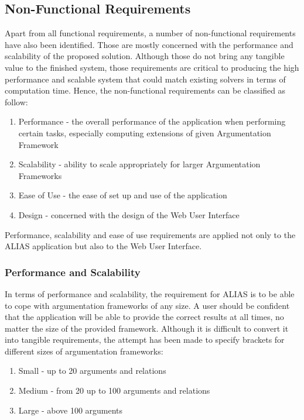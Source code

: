 \subsection{Non-Functional Requirements}
Apart from all functional requirements, a number of non-functional requirements have also been identified. Those are mostly concerned with the performance and scalability of the proposed solution. Although those do not bring any tangible value to the finished system, those requirements are critical to producing the high performance and scalable system that could match existing solvers in terms of computation time. Hence, the non-functional requirements can be classified as follow:

\begin{enumerate}
	\item Performance - the overall performance of the application when performing certain tasks, especially computing extensions of given Argumentation Framework
	\item Scalability - ability to scale appropriately for larger Argumentation Frameworks
	\item Ease of Use - the ease of set up and use of the application 
	\item Design - concerned with the design of the Web User Interface
\end{enumerate}

Performance, scalability and ease of use requirements are applied not only to the ALIAS application but also to the Web User Interface. 

\subsubsection{Performance and Scalability}

In terms of performance and scalability, the requirement for ALIAS is to be able to cope with argumentation frameworks of any size. A user should be confident that the application will be able to provide the correct results at all times, no matter the size of the provided framework. Although it is difficult to convert it into tangible requirements, the attempt has been made to specify brackets for different sizes of argumentation frameworks: 

\begin{enumerate}
	\item Small - up to 20 arguments and relations
	\item Medium - from 20 up to 100 arguments and relations
	\item Large - above 100 arguments 
\end{enumerate}

